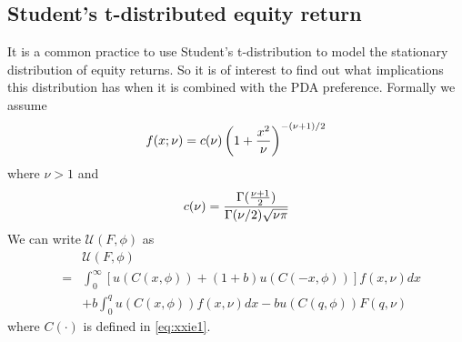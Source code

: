 \documentclass{article}
\newcommand{\1}[1]{
  \mathbf{1}_{\{#1\}}
}
\begin{document}













\subsection{Student's t-distributed equity return}
It is a common practice to use Student's t-distribution to model the
stationary distribution of equity returns. So it is of interest to
find out what implications this distribution has when it is combined
with the PDA preference. Formally we assume
\[
f(x; \nu) = c(\nu) \left(
  1 + {x^2 \over \nu}
\right)^{-(\nu + 1)/2}
\]
where $\nu > 1$ and
\[
c(\nu) = {
  \Gamma({\nu + 1 \over 2})
  \over
  \Gamma(\nu/2) \sqrt{\nu \pi}
}
\]
We can write $\mathcal U(F, \phi)$ as
\begin{eqnarray}
  && \mathcal U(F, \phi) \nonumber \\
  &=&
  \int_{0}^{\infty}
  \left[
    u(C(x, \phi)) + (1 + b)u(C(-x, \phi))
  \right]
  f(x, \nu) dx \nonumber \\
  &&
  + b \int_{0}^{q}
  u(C(x, \phi))
  f(x, \nu) dx - b u(C(q, \phi)) F(q, \nu)
  \label{eq:t1}
\end{eqnarray}
where $C(\cdot)$ is defined in \eqref{eq:xxie1}.
\end{document}

